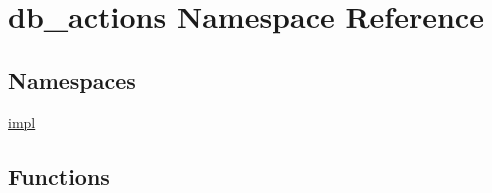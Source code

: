\hypertarget{namespacedb__actions}{}\section{db\+\_\+actions Namespace Reference}
\label{namespacedb__actions}
\subsection*{Namespaces}
\begin{DoxyCompactItemize}
\item 
 \hyperlink{namespacedb__actions_1_1impl}{impl}
\end{DoxyCompactItemize}
\subsection*{Functions}
